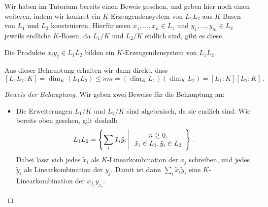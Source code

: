 Wir haben im Tutorium bereits einen Beweis gesehen, und geben hier noch einen weiteren, indem wir konkret ein $K$-Erzeugendensystem von $L_1 L_2$ aus $K$-Basen von $L_1$ und $L_2$ konstruieren.
Hierfür seien $x_1, \dotsc, x_n \in L_1$ und $y_1, \dotsc, y_m \in L_2$ jeweils endliche $K$-Basen;
da $L_1/K$ und $L_2/K$ endlich sind, gibt es diese.

\begin{claim*}
  Die Produkte $x_i y_j \in L_1 L_2$ bilden ein $K$-Erzeugendensystem von $L_1 L_2$.
\end{claim*}

Aus dieser Behauptung erhalten wir dann direkt, dass
\[
        [L_1 L_2 : K]
  =     \dim_K ( L_1 L_2 )
  \leq  n m
  =     (\dim_K L_1)(\dim_K L_2)
  =     [L_1 : K][L_2 : K] \,.
\]

\begin{proof}[Beweis der Behauptung]
  Wir geben zwei Beweise für die Behauptung an:
  \begin{itemize}
    \item
      Die Erweiterungen $L_1/K$ und $L_2/K$ sind algebraisch, da sie endlich sind.
      Wie bereits oben gesehen, gilt deshalb
      \[
          L_1 L_2
        = \left\{
            \sum_i \tilde{x}_i \tilde{y}_i
          \suchthat*
            \begin{array}{c}
              n \geq 0,
            \\
              \tilde{x}_i \in L_1,
              \tilde{y}_i \in L_2
            \end{array}
          \right\} \,.
      \]
      Dabei lässt sich jedes $\tilde{x}_i$ als $K$-Linearkombination der $x_j$ schreiben, und jedes $\tilde{y}_i$ als Linearkombination der $y_j$.
      Damit ist dann $\sum_i \tilde{x}_i \tilde{y}_i$ eine $K$-Linearkombination der $x_{j_1} y_{j_2}$.
      

\end{itemize}
\end{proof}
